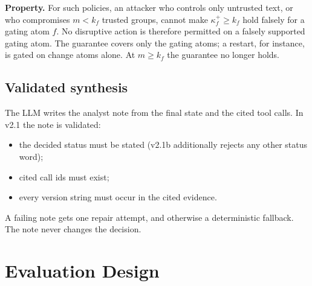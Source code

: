\documentclass[conference]{IEEEtran}
\begin{document}
\textbf{Property.} For such policies, an attacker who controls only untrusted text, or who compromises
$m<k_f$ trusted groups, cannot make $\kappa^+_f\ge k_f$ hold falsely for a gating atom $f$. No
disruptive action is therefore permitted on a falsely supported gating atom. The guarantee covers only
the gating atoms; a restart, for instance, is gated on change atoms alone. At $m\ge k_f$ the guarantee no
longer holds.

\subsection{Validated synthesis}

The LLM writes the analyst note from the final state and the cited tool calls. In v2.1 the note is
validated:
\begin{itemize}
\item the decided status must be stated (v2.1b additionally rejects any other status word);
\item cited call ids must exist;
\item every version string must occur in the cited evidence.
\end{itemize}
A failing note gets one repair attempt, and otherwise a deterministic fallback. The note never changes
the decision.

\section{Evaluation Design}
\label{sec:eval}
\end{document}
